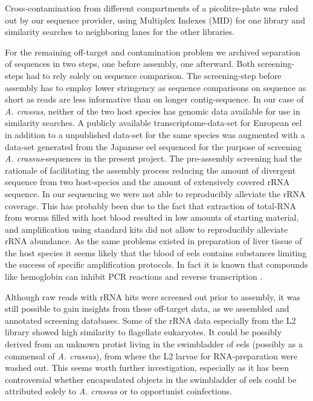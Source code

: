 Cross-contamination from different compartments of a picolitre-plate
was ruled out by our sequence provider, using Multiplex Indexes (MID)
for one library and similarity searches to neighboring lanes for the
other libraries.

For the remaining off-target and contamination problem we archived
separation of sequences in two steps, one before assembly, one
afterward. Both screening-steps had to rely solely on sequence
comparison. The screening-step before assembly has to employ lower
stringency as sequence comparisons on sequence as short as reads are
less informative than on longer contig-sequence. In our case of
\textit{A. crassus}, neither of the two host species has genomic data
available for use in similarity searches. A publicly available
transcriptome-data-set for European eel \cite{pmid21080939} in addition
to a unpublished data-set for the same species was augmented with a
data-set generated from the Japanese eel sequenced for the purpose of
screening \textit{A. crassus}-sequences in the present project. The
pre-assembly screening had the rationale of facilitating the assembly
process reducing the amount of divergent sequence from two
host-species and the amount of extensively covered rRNA sequence. In
our sequencing we were not able to reproducibly alleviate the rRNA
coverage. This has probably been due to the fact that extraction of
total-RNA from worms filled with host blood resulted in low amounts of
starting material, and amplification using standard kits did not allow
to reproducibly alleviate rRNA abundance. As the same problems
existed in preparation of liver tissue of the host species it seems
likely that the blood of eels contains substances limiting the success
of specific amplification protocols. In fact it is known that
compounds like hemoglobin can inhibit PCR reactions \cite{pmid9327537}
and reverse transcription \cite{pmid16109794}.

Although raw reads with rRNA hits were screened out prior to assembly,
it was still possible to gain insights from these off-target data, as
we assembled and annotated screening databases. Some of the rRNA data
especially from the L2 library showed high similarity to flagellate
eukaryotes. It could be possibly derived from an unknown protist
living in the swimbladder of eels (possibly as a commensal of
\textit{A. crassus}), from where the L2 larvae for RNA-preparation
were washed out. This seems worth further investigation, especially as
it has been controversial whether encapsulated objects in the
swimbladder of eels could be attributed solely to \textit{A. crassus}
\cite{heitlinger_massive_2009} or to opportunist coinfections.
 
